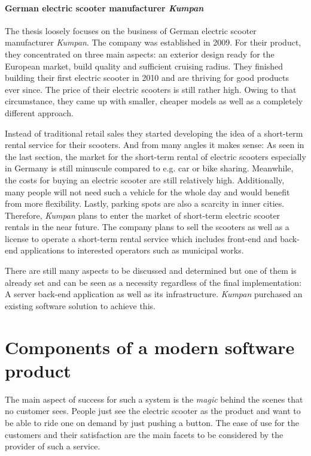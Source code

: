 \documentclass[12pt,a4paper]{report}
\begin{document}
\paragraph{German electric scooter manufacturer \textit{Kumpan}} \label{sect:kumpan}

The thesis loosely focuses on the business of German electric scooter manufacturer \textit{Kumpan}.
The company was established in 2009. For their product, they concentrated on three main aspects:
an exterior design ready for the European market, build quality and sufficient cruising radius.
They finished building their first electric scooter in 2010 and are thriving for good products ever since.
The price of their electric scooters is still rather high. Owing to that circumstance,
they came up with smaller, cheaper models as well as a completely different approach.

Instead of traditional retail sales they started developing the idea of a
short-term rental service for their scooters. And from many angles it makes sense:
As seen in the last section, the market for the short-term rental of electric scooters
especially in Germany is still minuscule compared to e.g. car or bike sharing.
Meanwhile, the costs for buying an electric scooter are still relatively high.
Additionally, many people will not need such a vehicle for the whole day and would benefit
from more flexibility. Lastly, parking spots are also a scarcity in inner cities.
Therefore, \textit{Kumpan} plans to enter the market of short-term electric scooter rentals
in the near future. The company plans to sell the scooters as well as a license
to operate a short-term rental service which includes front-end and back-end applications
to interested operators such as municipal works.

There are still many aspects to be discussed and determined but one of them
is already set and can be seen as a necessity regardless of the final implementation:
A server back-end application as well as its infrastructure.
\textit{Kumpan} purchased an existing software solution to achieve this.


\section{Components of a modern software product} \label{sect:frontend/backend}

The main aspect of success for such a system is the \textit{magic} behind the scenes
that no customer sees. People just see the electric scooter as the product and
want to be able to ride one on demand by just pushing a button.
The ease of use for the customers and their satisfaction are the main facets
to be considered by the provider of such a service.
\end{document}
